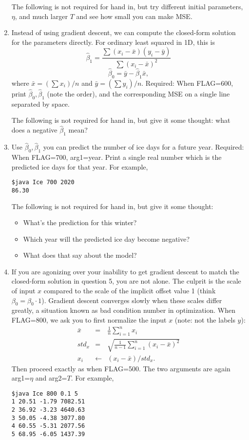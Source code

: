 \documentclass{article}
\begin{document}
\begin{enumerate}
The following is not required for hand in, but try different initial parameters, $\eta$, and much larger $T$ and see how small you can make MSE.

\item
Instead of using gradient descent, we can compute the closed-form solution for the parameters directly.
For ordinary least squared in 1D, this is
$$\hat\beta_1 = \frac{\sum (x_i - \bar x) (y_i - \bar y)}{\sum (x_i - \bar x)^2}$$
$$\hat\beta_0 = \bar y - \hat\beta_1\bar x,$$
where $\bar x = (\sum x_i)/n$
and $\bar y = (\sum y_i)/n$.
Required: When FLAG=600, print $\hat\beta_0, \hat\beta_1$ (note the order), and the corresponding MSE on a single line separated by space.

The following is not required for hand in, but give it some thought: what does a negative $\hat\beta_1$ mean?


\item
Use $\hat\beta_0, \hat\beta_1$ you can predict the number of ice days for a future year.
Required: When FLAG=700, arg1=year.  Print a single real number which is the predicted ice days for that year.
For example,
\begin{verbatim}
$java Ice 700 2020
86.30
\end{verbatim}

The following is not required for hand in, but give it some thought:
\begin{itemize}
\item What's the prediction for this winter?
\item Which year will the predicted ice day become negative?
\item What does that say about the model?
\end{itemize}

\item
If you are agonizing over your inability to get gradient descent to match the closed-form solution in question 5, you are not alone. 
The culprit is the scale of input $x$ compared to the scale of the implicit offset value 1 (think $\beta_0 = \beta_0 \cdot 1$).
Gradient descent converges slowly when these scales differ greatly, a situation known as bad condition number in optimization.
When FLAG=800, we ask you to first normalize the input $x$ (note: not the labels $y$):
\begin{eqnarray}
\bar x &=& \frac{1}{n}\sum_{i=1}^n x_i \\
std_x &=& \sqrt{\frac{1}{n-1}\sum_{i=1}^n (x_i - \bar x)^2 } \\
x_i &\leftarrow& (x_i - \bar x)/std_x.
\end{eqnarray}
Then proceed exactly as when FLAG=500.  The two arguments are again arg1=$\eta$ and arg2=$T$.
For example,
\begin{verbatim}
$java Ice 800 0.1 5
1 20.51 -1.79 7082.51
2 36.92 -3.23 4640.63
3 50.05 -4.38 3077.80
4 60.55 -5.31 2077.56
5 68.95 -6.05 1437.39


\end{verbatim}
\end{enumerate}
\end{document}
